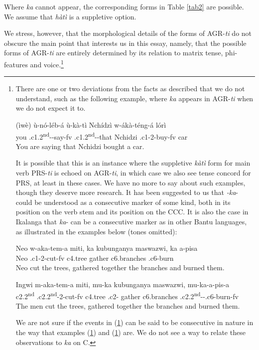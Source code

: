 \documentclass[output=paper,
modfonts
]{langscibook}
\begin{document}
Where \textit{ka} cannot appear, the corresponding forms in Table \ref{tab2} are possible. We assume that \textit{hàtì} is a suppletive option.


We stress, however, that the morphological details of the forms of AGR-\textit{ti} do not obscure the main point that interests us in this essay, namely, that the possible forms of AGR-\textit{ti} are entirely determined by its relation to matrix tense, phi-features and voice.\footnote{There are one or two deviations from the facts as described that we do not understand, such as the following example, where \textit{ka} appears in AGR-\textit{ti} when we do not expect it to.

\ea\label{24} \gll (ìwè)	ù-nó-léb-á ù-kà-tì Nchídzì w-ákà-téng-á lórì\\				
you .c1.2\textsuperscript{nd}--say-fv  .c1.2\textsuperscript{nd}--that  Nchidzi .c1-2-buy-fv	car\\ 
	\glt You are saying that Nchidzi bought a car. \z

It is possible that this is an instance where the suppletive \textit{kàtì} form for main verb PRS-\textit{ti} is echoed on AGR-\textit{ti}, in which case we also see tense concord for PRS, at least in these cases. We have no more to say about such examples, though they deserve more research. It has been suggested to us that \textit{-ka}- could be understood as a consecutive marker of some kind, both in its position on the verb stem and its position on the CCC. It is also the case in Ikalanga that \textit{ka}- can be a consecutive marker as in other Bantu languages, as illustrated in the examples below (tones omitted):

\ea\label{FN7.1} \gll Neo w-aka-tem-a miti, ka	kubunganya	maswazwi, ka a-pisa\\
      Neo .c1-2-cut-fv c4.tree  gather c6.branches  .c6-burn\\
      \glt Neo cut the trees, gathered together the branches and burned them.
      
 \ex\label{FN7.2}  \gll Ingwi	m-aka-tem-a	miti, mu-ka kubunganya maswazwi, mu-ka-a-pis-a\\
       c2.2\textsuperscript{nd}	.c2.2\textsuperscript{nd}-2-cut-fv	c4.tree	.c2- gather	 c6.branches 			.c2.2\textsuperscript{nd}--.c6-burn-fv\\
	\glt The men cut the trees, gathered together the branches and burned them.  \z

We are not sure if the events in (\ref{24}) can be said to be consecutive in nature in the way that examples (\ref{FN7.1}) and (\ref{FN7.2}) are. We do not see a way to relate these observations to \textit{ka} on C.}
\end{document}
